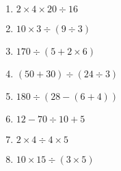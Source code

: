 \documentclass{exam}
\begin{document}
\begin{enumerate}[1)]
\item $2 \times 4 \times 20 \div 16$
\item $10 \times 3 \div \left(9 \div 3\right)$
\item $170 \div \left(5 + 2 \times 6\right)$
\item $\left(50 + 30\right) \div \left(24 \div 3\right)$
\item $180 \div \left(28 - \left(6 + 4\right)\right)$
\item $12 - 70 \div 10 + 5$
\item $2 \times 4 \div 4 \times 5$
\item $10 \times 15 \div \left(3 \times 5\right)$
\end{enumerate}
\end{document}
